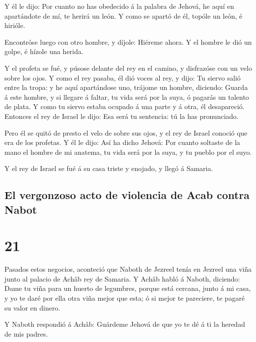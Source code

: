  Y él le dijo: Por cuanto no has obedecido á la palabra de
Jehová, he aquí en apartándote de mí, te herirá un león. Y como se
apartó de él, topóle un león, é hirióle.

 Encontróse luego con otro hombre, y díjole: Hiéreme ahora.
Y el hombre le dió un golpe, é hízole una herida.

 Y el profeta se fué, y púsose delante del rey en el
camino, y disfrazóse con un velo sobre los ojos.  Y como el
rey pasaba, él dió voces al rey, y dijo: Tu siervo salió entre la tropa:
y he aquí apartándose uno, trájome un hombre, diciendo: Guarda á este
hombre, y si llegare á faltar, tu vida será por la suya, ó pagarás un
talento de plata.  Y como tu siervo estaba ocupado á una
parte y á otra, él desapareció. Entonces el rey de Israel le dijo: Esa
será tu sentencia: tú la has pronunciado.

 Pero él se quitó de presto el velo de sobre sus ojos, y el
rey de Israel conoció que era de los profetas.  Y él le
dijo: Así ha dicho Jehová: Por cuanto soltaste de la mano el hombre de
mi anatema, tu vida será por la suya, y tu pueblo por el suyo.

 Y el rey de Israel se fué á su casa triste y enojado, y
llegó á Samaria.

\hypertarget{el-vergonzoso-acto-de-violencia-de-acab-contra-nabot}{%
\subsection{El vergonzoso acto de violencia de Acab contra
Nabot}\label{el-vergonzoso-acto-de-violencia-de-acab-contra-nabot}}

\hypertarget{section-20}{%
\section{21}\label{section-20}}

 Pasados estos negocios, aconteció que Naboth de Jezreel
tenía en Jezreel una viña junto al palacio de Achâb rey de Samaria.
 Y Achâb habló á Naboth, diciendo: Dame tu viña para un
huerto de legumbres, porque está cercana, junto á mi casa, y yo te daré
por ella otra viña mejor que esta; ó si mejor te pareciere, te pagaré su
valor en dinero.

 Y Naboth respondió á Achâb: Guárdeme Jehová de que yo te dé
á ti la heredad de mis padres.

